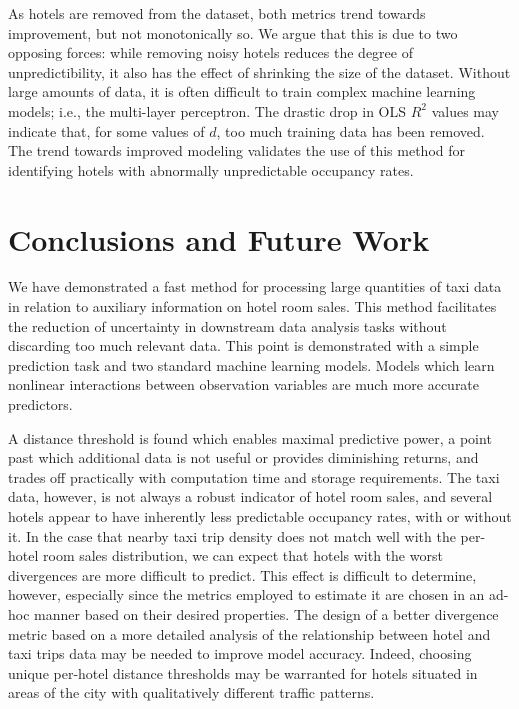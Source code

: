 \documentclass[useAMS, usenatbib]{biom}
\begin{document}
As hotels are removed from the dataset, both metrics trend towards improvement, but not monotonically so. We argue that this is due to two opposing forces: while removing noisy hotels reduces the degree of unpredictibility, it also has the effect of shrinking the size of the dataset. Without large amounts of data, it is often difficult to train complex machine learning models; i.e., the multi-layer perceptron. The drastic drop in OLS $R^2$ values may indicate that, for some values of $d$, too much training data has been removed. The trend towards improved modeling validates the use of this method for identifying hotels with abnormally unpredictable occupancy rates.


\section{Conclusions and Future Work}
\label{s:conclusion}

We have demonstrated a fast method for processing large quantities of taxi data in relation to auxiliary information on hotel room sales. This method facilitates the reduction of uncertainty in downstream data analysis tasks without discarding too much relevant data. This point is demonstrated with a simple prediction task and two standard machine learning models. Models which learn nonlinear interactions between observation variables are much more accurate predictors.

A distance threshold is found which enables maximal predictive power, a point past which additional data is not useful or provides diminishing returns, and trades off practically with computation time and storage requirements. The taxi data, however, is not always a robust indicator of hotel room sales, and several hotels appear to have inherently less predictable occupancy rates, with or without it. In the case that nearby taxi trip density does not match well with the per-hotel room sales distribution, we can expect that hotels with the worst divergences are more difficult to predict. This effect is difficult to determine, however, especially since the metrics employed to estimate it are chosen in an ad-hoc manner based on their desired properties. The design of a better divergence metric based on a more detailed analysis of the relationship between hotel and taxi trips data may be needed to improve model accuracy. Indeed, choosing unique per-hotel distance thresholds may be warranted for hotels situated in areas of the city with qualitatively different traffic patterns.
\end{document}
